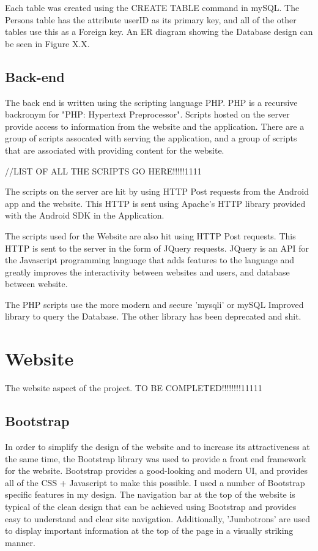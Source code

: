 \documentclass{l4proj}
\begin{document}
Each table was created using the CREATE TABLE command in mySQL. The Persons table has the attribute userID as its primary key, and all of the other tables use this as a Foreign key. An ER diagram showing the Database design can be seen in Figure X.X.

\subsection{Back-end}

The back end is written using the scripting language PHP. PHP is a recursive backronym for "PHP: Hypertext Preprocessor". Scripts hosted on the server provide access to information from the website and the application. There are a group of scripts assocated with serving the application, and a group of scripts that are associated with providing content for the website. 

//LIST OF ALL THE SCRIPTS GO HERE!!!!!1111

The scripts on the server are hit by using HTTP Post requests from the Android app and the website. This HTTP is sent using Apache's HTTP library provided with the Android SDK in the Application. 

The scripts used for the Website are also hit using HTTP Post requests. This HTTP is sent to the server in the form of JQuery requests. JQuery is an API for the Javascript programming language that adds features to the language and greatly improves the interactivity between websites and users, and database between website.

The PHP scripts use the more modern and secure 'mysqli' or mySQL Improved library to query the Database. The other library has been deprecated and shit.

\section{Website}

The website aspect of the project. TO BE COMPLETED!!!!!!!!11111

\subsection{Bootstrap}

In order to simplify the design of the website and to increase its attractiveness at the same time, the Bootstrap library was used to provide a front end framework for the website. Bootstrap provides a good-looking and modern UI, and provides all of the CSS + Javascript to make this possible. I used a number of Bootstrap specific features in my design. The navigation bar at the top of the website is typical of the clean design that can be achieved using Bootstrap and provides easy to understand and clear site navigation. Additionally, 'Jumbotrons' are used to display important information at the top of the page in a visually striking manner.
\end{document}
